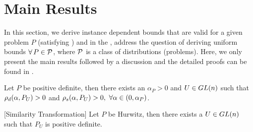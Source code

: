 \section{Main Results}\label{sec:mainresults}
In this section, we derive instance dependent bounds that are valid for a given problem $P$ (satisfying ) and in the , address the question of deriving uniform bounds $\forall\,P\in \P$, where $\P$ is a class of distributions (problems). Here, we only present the main results followed by a discussion and the detailed proofs can be found in .
\begin{lemma}\label{lm:pd}
Let $P$ be positive definite, then there exists an $\alpha_P>0$ and $U\in \gln$ such that $\rhod{P_U}>0$ and $\rhos{P_U}>0,~\forall \alpha \in (0,\alpha_P)$.
\end{lemma}
\begin{lemma}\label{lm:simtran}[Similarity Transformation]
Let $P$ be Hurwitz, then there exists a $U\in \gln$ such that $P_U$ is positive definite.
\end{lemma}
\begin{comment}
\begin{proof}
\begin{align*}
\rhos{P}&=\inf_{x:\norm{x}=1}x^* (A_P+A_P^*)x -\alpha x^*\EE{A_t^* A_t} x\\
&=\inf_{x:\norm{x}=1}x^* (A_P+A_P^*)x -\alpha x^* A^*_P A_P -\alpha x^* \EE{M_t^* M_t} x\\
&\geq \lambda_{\min}(A^*_P+A_P)-\alpha \norm{A_P}^2-\sigma^2_P
\end{align*}
The proof is complete by choosing $\alpha_P<\frac{\lambda_{\min}(A^*_P+A_P)}{\norm{A_P}^2+\sigma^2_P}$
\end{proof}
\end{comment}


